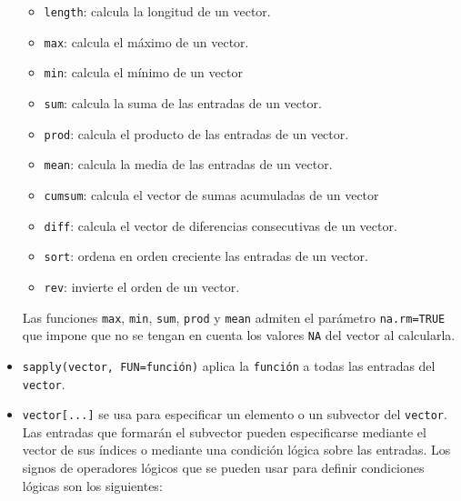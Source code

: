 \documentclass[
]{book}
\providecommand{\tightlist}{%
  \setlength{\itemsep}{0pt}\setlength{\parskip}{0pt}}
\theoremstyle{definition}
\theoremstyle{definition}
\theoremstyle{definition}
\theoremstyle{remark}
\begin{document}
\begin{itemize}
  \begin{itemize}
  \tightlist
  \item
    \texttt{length}: calcula la longitud de un vector.
  \item
    \texttt{max}: calcula el máximo de un vector.
  \item
    \texttt{min}: calcula el mínimo de un vector
  \item
    \texttt{sum}: calcula la suma de las entradas de un vector.
  \item
    \texttt{prod}: calcula el producto de las entradas de un vector.
  \item
    \texttt{mean}: calcula la media de las entradas de un vector.
  \item
    \texttt{cumsum}: calcula el vector de sumas acumuladas de un vector
  \item
    \texttt{diff}: calcula el vector de diferencias consecutivas de un vector.
  \item
    \texttt{sort}: ordena en orden creciente las entradas de un vector.
  \item
    \texttt{rev}: invierte el orden de un vector.
  \end{itemize}

  Las funciones \texttt{max}, \texttt{min}, \texttt{sum}, \texttt{prod} y \texttt{mean} admiten el parámetro \texttt{na.rm=TRUE} que impone que no se tengan en cuenta los valores \texttt{NA} del vector al calcularla.
\item
  \texttt{sapply(vector,\ FUN=función)} aplica la \texttt{función} a todas las entradas del \texttt{vector}.
\item
  \texttt{vector{[}...{]}} se usa para especificar un elemento o un subvector del \texttt{vector}. Las entradas que formarán el subvector pueden especificarse mediante el vector de sus índices o mediante una condición lógica sobre las entradas. Los signos de operadores lógicos que se pueden usar para definir condiciones lógicas son los siguientes:


\end{itemize}
\end{document}
